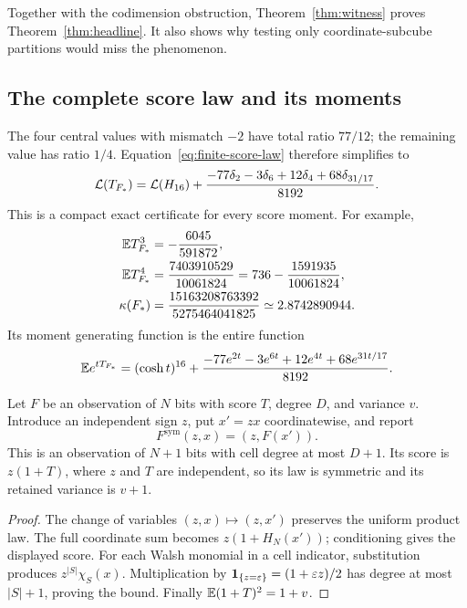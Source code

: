 Together with the codimension obstruction, Theorem~\ref{thm:witness}
proves Theorem~\ref{thm:headline}. It also shows why testing only
coordinate-subcube partitions would miss the phenomenon.

\subsection{The complete score law and its moments}

The four central values with mismatch \(-2\) have total ratio
\(77/12\); the remaining value has ratio \(1/4\).
Equation~\eqref{eq:finite-score-law} therefore simplifies to
\begin{equation}\label{eq:witness-score-law}
 \mathcal L(T_{F_*})=\mathcal L(H_{16})+
 \frac{-77\delta_2-3\delta_6+12\delta_4+68\delta_{31/17}}{8192}.
\end{equation}
This is a compact exact certificate for every score moment. For example,
\begin{align}
 \mathbb E T_{F_*}^3&=-\frac{6045}{591872},\notag\\
 \mathbb E T_{F_*}^4&=\frac{7403910529}{10061824}
             =736-\frac{1591935}{10061824},\label{eq:witness-moments}\\
 \kappa(F_*)&=\frac{15163208763392}{5275464041825}
             \simeq2.8742890944.\notag
\end{align}
Its moment generating function is the entire function
\begin{equation}\label{eq:witness-mgf}
 \mathbb E e^{tT_{F_*}}
 =(\cosh t)^{16}+
 \frac{-77e^{2t}-3e^{6t}+12e^{4t}+68e^{31t/17}}{8192}.
\end{equation}

\begin{lemma}\label{lem:symmetrize}
Let \(F\) be an observation of \(N\) bits with score \(T\), degree
\(D\), and variance \(v\). Introduce an independent sign \(z\), put
\(x'=zx\) coordinatewise, and report
\[
 F^{\mathrm{sym}}(z,x)=(z,F(x')).
\]
This is an observation of \(N+1\) bits with cell degree at most \(D+1\).
Its score is \(z(1+T)\), where \(z\) and \(T\) are independent, so
its law is symmetric and its retained variance is \(v+1\).
\end{lemma}

\begin{proof}
The change of variables \((z,x)\mapsto(z,x')\) preserves the uniform
product law. The full coordinate sum becomes \(z(1+H_N(x'))\);
conditioning gives the displayed score.
For each Walsh monomial in a cell indicator,
substitution produces \(z^{|S|}\chi_S(x)\).
Multiplication by \(\mathbf 1_{\{z=\varepsilon\}}=(1+\varepsilon z)/2\)
has degree at most \(|S|+1\), proving the bound. Finally
\(\mathbb E(1+T)^2=1+v\).
\end{proof}

